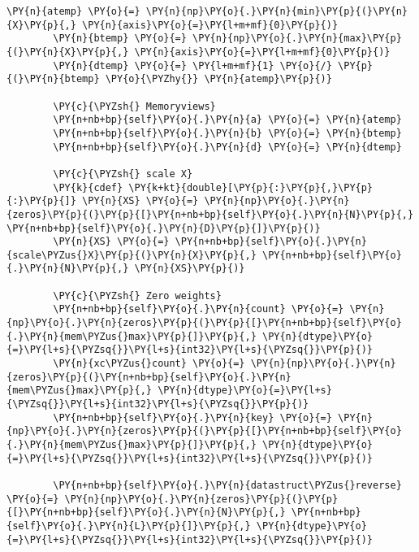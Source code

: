 \begin{Verbatim}[commandchars=\\\{\}]
        \PY{n}{atemp} \PY{o}{=} \PY{n}{np}\PY{o}{.}\PY{n}{min}\PY{p}{(}\PY{n}{X}\PY{p}{,} \PY{n}{axis}\PY{o}{=}\PY{l+m+mf}{0}\PY{p}{)}
        \PY{n}{btemp} \PY{o}{=} \PY{n}{np}\PY{o}{.}\PY{n}{max}\PY{p}{(}\PY{n}{X}\PY{p}{,} \PY{n}{axis}\PY{o}{=}\PY{l+m+mf}{0}\PY{p}{)}
        \PY{n}{dtemp} \PY{o}{=} \PY{l+m+mf}{1} \PY{o}{/} \PY{p}{(}\PY{n}{btemp} \PY{o}{\PYZhy{}} \PY{n}{atemp}\PY{p}{)}

        \PY{c}{\PYZsh{} Memoryviews}
        \PY{n+nb+bp}{self}\PY{o}{.}\PY{n}{a} \PY{o}{=} \PY{n}{atemp}
        \PY{n+nb+bp}{self}\PY{o}{.}\PY{n}{b} \PY{o}{=} \PY{n}{btemp}
        \PY{n+nb+bp}{self}\PY{o}{.}\PY{n}{d} \PY{o}{=} \PY{n}{dtemp}
        
        \PY{c}{\PYZsh{} scale X}
        \PY{k}{cdef} \PY{k+kt}{double}[\PY{p}{:}\PY{p}{,}\PY{p}{:}\PY{p}{]} \PY{n}{XS} \PY{o}{=} \PY{n}{np}\PY{o}{.}\PY{n}{zeros}\PY{p}{(}\PY{p}{[}\PY{n+nb+bp}{self}\PY{o}{.}\PY{n}{N}\PY{p}{,} \PY{n+nb+bp}{self}\PY{o}{.}\PY{n}{D}\PY{p}{]}\PY{p}{)}
        \PY{n}{XS} \PY{o}{=} \PY{n+nb+bp}{self}\PY{o}{.}\PY{n}{scale\PYZus{}X}\PY{p}{(}\PY{n}{X}\PY{p}{,} \PY{n+nb+bp}{self}\PY{o}{.}\PY{n}{N}\PY{p}{,} \PY{n}{XS}\PY{p}{)}

        \PY{c}{\PYZsh{} Zero weights}
        \PY{n+nb+bp}{self}\PY{o}{.}\PY{n}{count} \PY{o}{=} \PY{n}{np}\PY{o}{.}\PY{n}{zeros}\PY{p}{(}\PY{p}{[}\PY{n+nb+bp}{self}\PY{o}{.}\PY{n}{mem\PYZus{}max}\PY{p}{]}\PY{p}{,} \PY{n}{dtype}\PY{o}{=}\PY{l+s}{\PYZsq{}}\PY{l+s}{int32}\PY{l+s}{\PYZsq{}}\PY{p}{)}
        \PY{n}{xc\PYZus{}count} \PY{o}{=} \PY{n}{np}\PY{o}{.}\PY{n}{zeros}\PY{p}{(}\PY{n+nb+bp}{self}\PY{o}{.}\PY{n}{mem\PYZus{}max}\PY{p}{,} \PY{n}{dtype}\PY{o}{=}\PY{l+s}{\PYZsq{}}\PY{l+s}{int32}\PY{l+s}{\PYZsq{}}\PY{p}{)}
        \PY{n+nb+bp}{self}\PY{o}{.}\PY{n}{key} \PY{o}{=} \PY{n}{np}\PY{o}{.}\PY{n}{zeros}\PY{p}{(}\PY{p}{[}\PY{n+nb+bp}{self}\PY{o}{.}\PY{n}{mem\PYZus{}max}\PY{p}{]}\PY{p}{,} \PY{n}{dtype}\PY{o}{=}\PY{l+s}{\PYZsq{}}\PY{l+s}{int32}\PY{l+s}{\PYZsq{}}\PY{p}{)}
        
        \PY{n+nb+bp}{self}\PY{o}{.}\PY{n}{datastruct\PYZus{}reverse} \PY{o}{=} \PY{n}{np}\PY{o}{.}\PY{n}{zeros}\PY{p}{(}\PY{p}{[}\PY{n+nb+bp}{self}\PY{o}{.}\PY{n}{N}\PY{p}{,} \PY{n+nb+bp}{self}\PY{o}{.}\PY{n}{L}\PY{p}{]}\PY{p}{,} \PY{n}{dtype}\PY{o}{=}\PY{l+s}{\PYZsq{}}\PY{l+s}{int32}\PY{l+s}{\PYZsq{}}\PY{p}{)}


\end{Verbatim}
